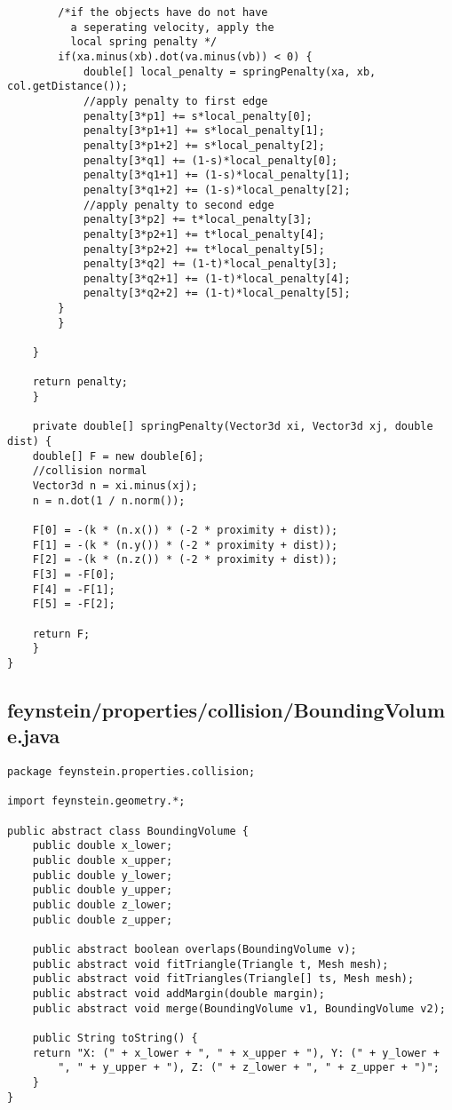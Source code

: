 \begin{lstlisting}
		/*if the objects have do not have
		  a seperating velocity, apply the 
		  local spring penalty */
		if(xa.minus(xb).dot(va.minus(vb)) < 0) {
		    double[] local_penalty = springPenalty(xa, xb, col.getDistance());
		    //apply penalty to first edge
		    penalty[3*p1] += s*local_penalty[0];
		    penalty[3*p1+1] += s*local_penalty[1];
		    penalty[3*p1+2] += s*local_penalty[2];
		    penalty[3*q1] += (1-s)*local_penalty[0];
		    penalty[3*q1+1] += (1-s)*local_penalty[1];
		    penalty[3*q1+2] += (1-s)*local_penalty[2];
		    //apply penalty to second edge
		    penalty[3*p2] += t*local_penalty[3];
		    penalty[3*p2+1] += t*local_penalty[4];
		    penalty[3*p2+2] += t*local_penalty[5];
		    penalty[3*q2] += (1-t)*local_penalty[3];
		    penalty[3*q2+1] += (1-t)*local_penalty[4];
		    penalty[3*q2+2] += (1-t)*local_penalty[5];
		}
	    }
		
	}

	return penalty;
    }

    private double[] springPenalty(Vector3d xi, Vector3d xj, double dist) {
	double[] F = new double[6];
	//collision normal
	Vector3d n = xi.minus(xj);
	n = n.dot(1 / n.norm());
	
	F[0] = -(k * (n.x()) * (-2 * proximity + dist));
	F[1] = -(k * (n.y()) * (-2 * proximity + dist));
	F[2] = -(k * (n.z()) * (-2 * proximity + dist));
	F[3] = -F[0];
	F[4] = -F[1];
	F[5] = -F[2];

	return F;
    }
}\end{lstlisting}

\subsection*{feynstein/properties/collision/BoundingVolume.java}
\begin{lstlisting}
package feynstein.properties.collision;

import feynstein.geometry.*;

public abstract class BoundingVolume {
    public double x_lower;
    public double x_upper;
    public double y_lower;
    public double y_upper;
    public double z_lower;
    public double z_upper;

    public abstract boolean overlaps(BoundingVolume v);
    public abstract void fitTriangle(Triangle t, Mesh mesh);
    public abstract void fitTriangles(Triangle[] ts, Mesh mesh);
    public abstract void addMargin(double margin);
    public abstract void merge(BoundingVolume v1, BoundingVolume v2);

    public String toString() {
	return "X: (" + x_lower + ", " + x_upper + "), Y: (" + y_lower + 
	    ", " + y_upper + "), Z: (" + z_lower + ", " + z_upper + ")";
    }
}\end{lstlisting}

